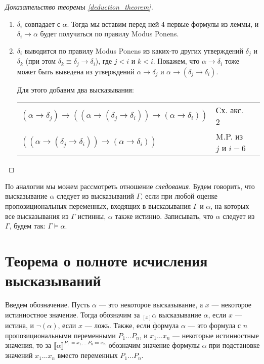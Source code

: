 \begin{proof}[Доказательство теоремы \ref{deduction_theorem}]
\begin{enumerate}
\item $\delta_i$ совпадает с $\alpha$. Тогда мы вставим перед 
ней 4 первые формулы из леммы, и $\delta_i \rightarrow \alpha$ будет получаться
по правилу Modus Ponens.

\item $\delta_i$ выводится по правилу Modus Ponens из каких-то других
утверждений $\delta_j$ и $\delta_k$ (при этом 
$\delta_k \equiv \delta_j \rightarrow \delta_i$), где $j < i$ и $k < i$.
Покажем, что $\alpha \rightarrow \delta_i$ тоже может быть выведена
из утверждений $\alpha \rightarrow \delta_j$ и 
$\alpha \rightarrow (\delta_j \rightarrow \delta_i)$.

Для этого добавим два высказывания:

\begin{tabular}{lll}
$(\alpha \rightarrow \delta_j) \rightarrow ((\alpha \rightarrow (\delta_j \rightarrow \delta_i)) \rightarrow (\alpha \rightarrow \delta_i))$ & Сх. акс. 2\\
$((\alpha \rightarrow (\delta_j \rightarrow \delta_i)) \rightarrow (\alpha \rightarrow \delta_i))$ & M.P. из $j$ и $i-6$\\
\end{tabular}

\end{enumerate}
\end{proof}

По аналогии мы можем рассмотреть отношение \emph{следования}.
Будем говорить, что высказывание $\alpha$ следует из высказываний $\Gamma$,
если при любой оценке пропозициональных переменных, входящих в высказывания 
$\Gamma$ и $\alpha$, на которых все высказывания из $\Gamma$ истинны, 
$\alpha$ также истинно.
Записывать, что $\alpha$ следует из $\Gamma$, будем так: $\Gamma \models \alpha$.

\section{Теорема о полноте исчисления высказываний}

\begin{definition} 
Введем обозначение. Пусть $\alpha$ --- это некоторое высказывание, а $x$ --- некоторое
истинностное значение. Тогда обозначим за $_{[x]}\alpha$ высказывание
$\alpha$, если $x$ --- истина, и $\neg (\alpha)$, если $x$ --- ложь.
Также, если формула $\alpha$ --- это формула с $n$ пропозициональными переменными
$P_1 \dots P_n$, и $x_1 \dots x_n$ --- некоторые истинностные значения,
то за $\llbracket \alpha \rrbracket^{P_1 \coloneqq  x_1, \dots P_n \coloneqq  x_n}$ обозначим значение 
формулы $\alpha$ при подстановке значений $x_1 \dots x_n$ вместо переменных $P_1 \dots P_n$.
\end{definition}


